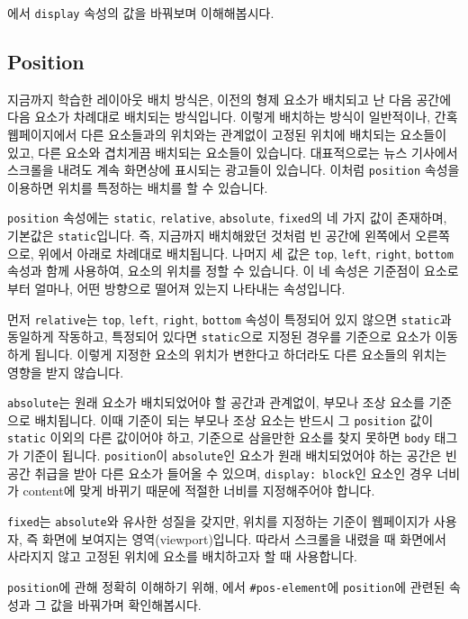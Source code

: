 에서 \texttt{display} 속성의 값을 바꿔보며 이해해봅시다. 

\subsection*{Position}
지금까지 학습한 레이아웃 배치 방식은, 이전의 형제 요소가 배치되고 난 다음 공간에 다음 요소가 차례대로 배치되는 방식입니다. 이렇게 배치하는 방식이 일반적이나, 간혹 웹페이지에서 다른 요소들과의 위치와는 관계없이 고정된 위치에 배치되는 요소들이 있고, 다른 요소와 겹치게끔 배치되는 요소들이 있습니다. 대표적으로는 뉴스 기사에서 스크롤을 내려도 계속 화면상에 표시되는 광고들이 있습니다. 이처럼 \texttt{position} 속성을 이용하면 위치를 특정하는 배치를 할 수 있습니다. 

\texttt{position} 속성에는 \texttt{static}, \texttt{relative}, \texttt{absolute}, \texttt{fixed}의 네 가지 값이 존재하며, 기본값은 \texttt{static}입니다. 즉, 지금까지 배치해왔던 것처럼 빈 공간에 왼쪽에서 오른쪽으로, 위에서 아래로 차례대로 배치됩니다. 나머지 세 값은 \texttt{top}, \texttt{left}, \texttt{right}, \texttt{bottom} 속성과 함께 사용하여, 요소의 위치를 정할 수 있습니다. 이 네 속성은 기준점이 요소로부터 얼마나, 어떤 방향으로 떨어져 있는지 나타내는 속성입니다.

먼저 \texttt{relative}는 \texttt{top}, \texttt{left}, \texttt{right}, \texttt{bottom} 속성이 특정되어 있지 않으면 \texttt{static}과 동일하게 작동하고, 특정되어 있다면 \texttt{static}으로 지정된 경우를 기준으로 요소가 이동하게 됩니다. 이렇게 지정한 요소의 위치가 변한다고 하더라도 다른 요소들의 위치는 영향을 받지 않습니다. 

\texttt{absolute}는 원래 요소가 배치되었어야 할 공간과 관계없이, 부모나 조상 요소를 기준으로 배치됩니다. 이때 기준이 되는 부모나 조상 요소는 반드시 그 \texttt{position} 값이 \texttt{static} 이외의 다른 값이어야 하고, 기준으로 삼을만한 요소를 찾지 못하면 \texttt{body} 태그가 기준이 됩니다. \texttt{position}이 \texttt{absolute}인 요소가 원래 배치되었어야 하는 공간은 빈 공간 취급을 받아 다른 요소가 들어올 수 있으며, \texttt{display: block}인 요소인 경우 너비가 content에 맞게 바뀌기 때문에 적절한 너비를 지정해주어야 합니다. 

\texttt{fixed}는 \texttt{absolute}와 유사한 성질을 갖지만, 위치를 지정하는 기준이 웹페이지가 사용자, 즉 화면에 보여지는 영역(viewport)입니다. 따라서 스크롤을 내렸을 때 화면에서 사라지지 않고 고정된 위치에 요소를 배치하고자 할 때 사용합니다. 

\texttt{position}에 관해 정확히 이해하기 위해, 에서 \texttt{\#pos-element}에 \texttt{position}에 관련된 속성과 그 값을 바꿔가며 확인해봅시다. 

